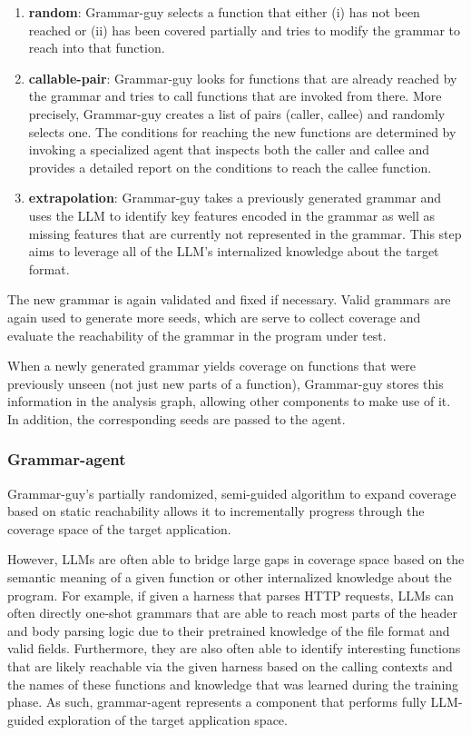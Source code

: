 \begin{enumerate}
\item \textbf{random}: Grammar-guy selects a function that either (i) has not been reached or (ii) has been covered partially and tries to modify the grammar to reach into that function.
\item \textbf{callable-pair}: Grammar-guy looks for functions that are already reached by the grammar and tries to call functions that are invoked from there. More precisely, Grammar-guy creates a list of pairs (caller, callee) and randomly selects one.
The conditions for reaching the new functions are determined by invoking a specialized agent that inspects both the caller and callee and provides a detailed report on the conditions to reach the callee function.
\item \textbf{extrapolation}: Grammar-guy takes a previously generated grammar and uses the LLM to identify key features encoded in the grammar as well as missing features that are currently not represented in the grammar. This step aims to leverage all of the LLM's internalized knowledge about the target format.
\end{enumerate}

The new grammar is again validated and fixed if necessary. Valid grammars are again used to generate more seeds, which are serve to collect coverage and evaluate the reachability of the grammar in the program under test.

When a newly generated grammar yields coverage on functions that were previously unseen (not just new parts of a function), Grammar-guy stores this information in the analysis graph, allowing other components to make use of it.
In addition, the corresponding seeds are passed to the \seedsync agent.

\subsubsection{Grammar-agent}

Grammar-guy's partially randomized, semi-guided algorithm to expand coverage based on static reachability allows it to incrementally progress through the coverage space of the target application.

However, LLMs are often able to bridge large gaps in coverage space based on the semantic meaning of a given function or other internalized knowledge about the program.
For example, if given a harness that parses HTTP requests, LLMs can often directly one-shot grammars that are able to reach most parts of the header and body parsing logic due to their pretrained knowledge of the file format and valid fields. Furthermore, they are also often able to identify interesting functions that are likely reachable via the given harness based on the calling contexts and the names of these functions and knowledge that was learned during the training phase.
As such, grammar-agent represents a component that performs fully LLM-guided exploration of the target application space.

